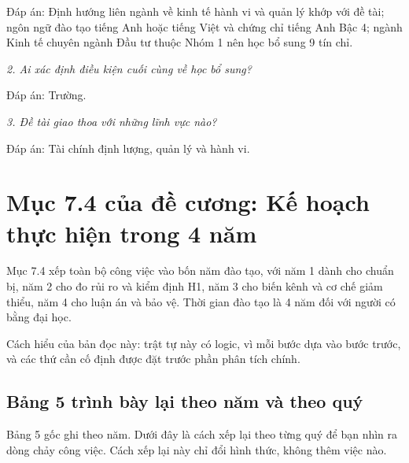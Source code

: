 Đáp án: Định hướng liên ngành về kinh tế hành vi và quản lý khớp với đề tài; ngôn ngữ đào tạo tiếng Anh hoặc tiếng Việt và chứng chỉ tiếng Anh Bậc 4; ngành Kinh tế chuyên ngành Đầu tư thuộc Nhóm 1 nên học bổ sung 9 tín chỉ.

{\itshape 2. Ai xác định điều kiện cuối cùng về học bổ sung?\par}

Đáp án: Trường.

{\itshape 3. Đề tài giao thoa với những lĩnh vực nào?\par}

Đáp án: Tài chính định lượng, quản lý và hành vi.

\chapter{Mục 7.4 của đề cương: Kế hoạch thực hiện trong 4 năm}

Mục 7.4 xếp toàn bộ công việc vào bốn năm đào tạo, với năm 1 dành cho chuẩn bị, năm 2 cho đo rủi ro và kiểm định H1, năm 3 cho biến kênh và cơ chế giảm thiểu, năm 4 cho luận án và bảo vệ. Thời gian đào tạo là 4 năm đối với người có bằng đại học.

Cách hiểu của bản đọc này: trật tự này có logic, vì mỗi bước dựa vào bước trước, và các thứ cần cố định được đặt trước phần phân tích chính.

\section{Bảng 5 trình bày lại theo năm và theo quý}

Bảng 5 gốc ghi theo năm. Dưới đây là cách xếp lại theo từng quý để bạn nhìn ra dòng chảy công việc. Cách xếp lại này chỉ đổi hình thức, không thêm việc nào.

